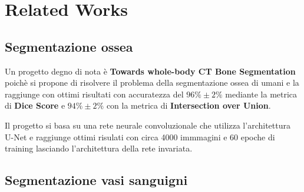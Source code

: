 \section{Related Works}
\subsection{Segmentazione ossea}


Un progetto degno di nota \`e \textbf{Towards whole-body CT Bone Segmentation} \cite{Klein_2018}
poich\`e si propone di risolvere il problema della segmentazione ossea di umani e la raggiunge con
ottimi risultati con accuratezza del $96\%\pm 2\%$ mediante la metrica di \textbf{Dice Score} e $94\%\pm 2\%$ con la metrica di \textbf{Intersection over Union}.


Il progetto si basa su una rete neurale convoluzionale che utilizza l'architettura U-Net \cite{ronneberger2015unet}
e raggiunge ottimi risulati con circa 4000 immmagini e 60 epoche di training lasciando
l'architettura della rete invariata.


\subsection{Segmentazione vasi sanguigni}
%





